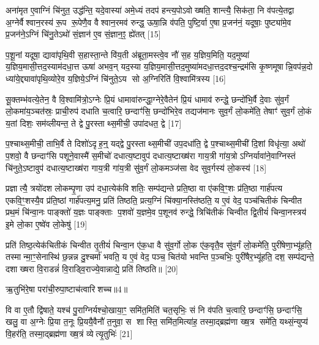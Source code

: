 अना॑मृत ए॒वाग्निं चि॑नुत॒ उद्ध॑न्ति॒ यदे॒वास्या॑ अमे॒ध्यं तदप॑ हन्त्य॒पोऽवोख्षति॒ शान्त्यै॒ सिक॑ता॒ नि व॑पत्ये॒तद्वा अ॒ग्नेर्वैश्वान॒रस्य॑ रू॒प रू॒पेणै॒व वैश्वान॒रमव॑ रुन्द्ध॒ ऊषा॒न्नि व॑पति॒ पुष्टि॒र्वा ए॒षा प्र॒जन॑नं॒ यदूषाः॒ पुष्ट्या॑मे॒व प्र॒जन॑ने॒ऽग्निं चि॑नु॒तेऽथो॑ सं॒ज्ञान॑ ए॒व सं॒ज्ञान॒ꣵ॒ ह्ये॑तत् [15]

प॒शू॒नां यदूषा॒ द्यावा॑पृथि॒वी स॒हास्ता॒न्ते वि॑य॒ती अ॑ब्रूता॒मस्त्वे॒व नौ॑ स॒ह य॒ज्ञिय॒मिति॒ यद॒मुष्या॑ य॒ज्ञिय॒मासी॒त्तद॒स्याम॑दधा॒त्त ऊषा॑ अभव॒न् यद॒स्या य॒ज्ञिय॒मासी॒त्तद॒मुष्या॑मदधा॒त्तद॒दश्च॒न्द्रम॑सि कृ॒ष्णमूषान्नि॒वप॑न्न॒दो ध्या॑ये॒द्द्यावा॑पृथि॒व्योरे॒व य॒ज्ञिये॒ऽग्निं चि॑नुते॒ऽय सो अ॒ग्निरिति॑ वि॒श्वामि॑त्रस्य [16]

सू॒क्तम्भ॑वत्ये॒तेन॒ वै वि॒श्वामि॑त्रो॒ऽग्नेः प्रि॒यं धामावा॑रुन्द्धा॒ग्नेरे॒वैतेन॑ प्रि॒यं धामाव॑ रुन्द्धे॒ छन्दो॑भि॒र्वै दे॒वाः सु॑व॒र्गं लो॒कमा॑य॒ञ्चत॑स्रः॒ प्राची॒रुप॑ दधाति च॒त्वारि॒ छन्दाꣳ॑सि॒ छन्दो॑भिरे॒व तद्यज॑मानः सुव॒र्गं लो॒कमे॑ति॒ तेषाꣳ॑ सुव॒र्गं लो॒कं य॒तां दिशः॒ सम॑व्लीयन्त॒ ते द्वे पु॒रस्ताथ्स॒मीची॒ उपा॑दधत॒ द्वे [17]

प॒श्चाथ्स॒मीची॒ ताभि॒र्वै ते दिशो॑ऽदृह॒न्॒ यद्द्वे पु॒रस्ताथ्स॒मीची॑ उप॒दधा॑ति॒ द्वे प॒श्चाथ्स॒मीची॑ दि॒शां विधृ॑त्या॒ अथो॑ प॒शवो॒ वै छन्दाꣳ॑सि पशूने॒वास्मै॑ स॒मीचो॑ दधात्य॒ष्टावुप॑ दधात्य॒ष्टाख्ष॑रा गाय॒त्री गा॑य॒त्रोऽग्निर्यावा॑ने॒वाग्निस्तं चि॑नुते॒ऽष्टावुप॑ दधात्य॒ष्टाख्ष॑रा गाय॒त्री गा॑य॒त्री सु॑व॒र्गं लो॒कमञ्ज॑सा वेद सुव॒र्गस्य॑ लो॒कस्य॑ [18]

प्रज्ञात्यै॒ त्रयो॑दश लोकम्पृ॒णा उप॑ दधा॒त्येक॑विशतिः॒ सम्प॑द्यन्ते प्रति॒ष्ठा वा ए॑कवि॒ꣳ॒शः प्र॑ति॒ष्ठा गार्\mbox{}ह॑पत्य एकवि॒ꣳ॒शस्यै॒व प्र॑ति॒ष्ठां गार्\mbox{}ह॑पत्य॒मनु॒ प्रति॑ तिष्ठति॒ प्रत्य॒ग्निं चि॑क्या॒नस्ति॑ष्ठति॒ य ए॒वं वेद॒ पञ्च॑चितीकं चिन्वीत प्रथ॒मं चि॑न्वा॒नः पाङ्क्तो॑ य॒ज्ञः पाङ्क्ताः प॒शवो॑ य॒ज्ञमे॒व प॒शूनव॑ रुन्द्धे॒ त्रिचि॑तीकं चिन्वीत द्वि॒तीयं॑ चिन्वा॒नस्त्रय॑ इ॒मे लो॒का ए॒ष्वे॑व लो॒केषु॑ [19]

प्रति॑ तिष्ठ॒त्येक॑चितीकं चिन्वीत तृ॒तीयं॑ चिन्वा॒न ए॑क॒धा वै सु॑व॒र्गो लो॒क ए॑क॒वृतै॒व सु॑व॒र्गं लो॒कमे॑ति॒ पुरी॑षेणा॒भ्यू॑हति॒ तस्मान्मा॒ꣳ॒सेनास्थि॑ छ॒न्नन्न दु॒श्चर्मा॑ भवति॒ य ए॒वं वेद॒ पञ्च॒ चित॑यो भवन्ति प॒ञ्चभिः॒ पुरी॑षैर॒भ्यू॑हति॒ दश॒ सम्प॑द्यन्ते॒ दशाख्षरा वि॒राडन्नं॑ वि॒राड्वि॒राज्ये॒वान्नाद्ये॒ प्रति॑ तिष्ठति॥ [20]

{\scriptsize {ऋ॒तुभि॑रे॒षा परा॑ची॒रुपा॒ष्टाच॑त्वारिशच्च॥4॥}}

वि वा ए॒तौ द्वि॑षाते॒ यश्च॑ पु॒राग्निर्यश्चो॒खाया॒ꣳ॒ समि॑त॒मिति॑ चत॒सृभिः॒ सं नि व॑पति च॒त्वारि॒ छन्दाꣳ॑सि॒ छन्दाꣳ॑सि॒ खलु॒ वा अ॒ग्नेः प्रि॒या त॒नूः प्रि॒ययै॒वैनौ॑ त॒नुवा॒ स शास्ति॒ समि॑त॒मित्या॑ह॒ तस्मा॒द्ब्रह्म॑णा ख्ष॒त्र समे॑ति॒ यथ्सं॒न्युप्य॑ वि॒हर॑ति॒ तस्मा॒द्ब्रह्म॑णा ख्ष॒त्रं व्येत्यृ॒तुभिः॑ [21]

